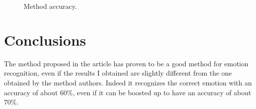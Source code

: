 \documentclass[10pt,journal,A4paper,compsoc,epsfig]{IEEEtran}
\begin{document}
\begin{figure}[H]

\caption{Method accuracy.}
\label{Fig:method_accuracy}
\end{figure}




\section{Conclusions}
The method proposed in the article \cite{zhuang2017emotion} has proven to be a good method for emotion recognition, even if the results I obtained are slightly different from the one obtained by the method authors. Indeed it recognizes the correct emotion with an accuracy of about 60\%, even if it can be boosted up to have an accuracy of about 70\%.




\end{document}
